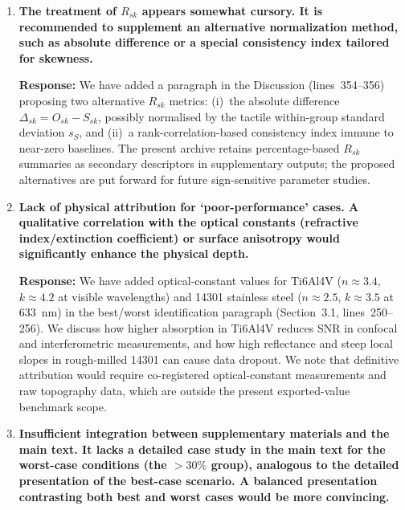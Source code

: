 \documentclass[10pt]{article}
\begin{document}
\begin{enumerate}[leftmargin=*, label=\textbf{Comment \arabic*.}, ref=\arabic*]

\item \textbf{The treatment of $R_{sk}$ appears somewhat cursory. It is recommended to supplement an alternative normalization method, such as absolute difference or a special consistency index tailored for skewness.}

\textbf{Response:} We have added a paragraph in the Discussion (lines~354--356) proposing two alternative $R_{sk}$ metrics: (i)~the absolute difference $\Delta_{sk} = O_{sk} - S_{sk}$, possibly normalised by the tactile within-group standard deviation $s_S$, and (ii)~a rank-correlation-based consistency index immune to near-zero baselines. The present archive retains percentage-based $R_{sk}$ summaries as secondary descriptors in supplementary outputs; the proposed alternatives are put forward for future sign-sensitive parameter studies.

\item \textbf{Lack of physical attribution for `poor-performance' cases. A qualitative correlation with the optical constants (refractive index/extinction coefficient) or surface anisotropy would significantly enhance the physical depth.}

\textbf{Response:} We have added optical-constant values for Ti6Al4V ($n \approx 3.4$, $k \approx 4.2$ at visible wavelengths) and 14301 stainless steel ($n \approx 2.5$, $k \approx 3.5$ at 633~nm) in the best/worst identification paragraph (Section~3.1, lines~250--256). We discuss how higher absorption in Ti6Al4V reduces SNR in confocal and interferometric measurements, and how high reflectance and steep local slopes in rough-milled 14301 can cause data dropout. We note that definitive attribution would require co-registered optical-constant measurements and raw topography data, which are outside the present exported-value benchmark scope.

\item \textbf{Insufficient integration between supplementary materials and the main text. It lacks a detailed case study in the main text for the worst-case conditions (the $>30\%$ group), analogous to the detailed presentation of the best-case scenario. A balanced presentation contrasting both best and worst cases would be more convincing.}


\end{enumerate}
\end{document}
